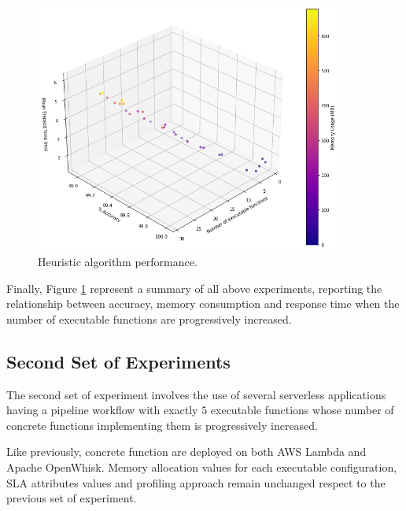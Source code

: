 \documentclass[12pt,a4paper]{report}
\begin{document}
\begin{figure}[h]
	\centering
	\includegraphics[width=0.9\textwidth]{./experiments/ACO3DIncreasingExecutable.png}
	\caption{Heuristic algorithm performance.}%
	\label{ACO3DIncreasingExecutable}
\end{figure}

Finally, Figure \ref{ACO3DIncreasingExecutable} represent a summary of all above experiments, reporting the relationship between accuracy, memory consumption and response time when the number of executable functions are progressively increased.

\newpage
\subsection{Second Set of Experiments}

The second set of experiment involves the use of several serverless applications having a pipeline workflow with exactly $5$ executable functions whose number of concrete functions implementing them is progressively increased. 

Like previously, concrete function are deployed on both AWS Lambda and Apache OpenWhisk. Memory allocation values for each executable configuration, SLA attributes values and profiling approach  remain unchanged respect to the previous set of experiment. 
\end{document}
